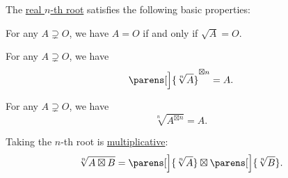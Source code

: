 \begin{proposition}\label{thm:def:principal_nonnegative_nth_root}
  The \hyperref[def:principal_nonnegative_nth_root]{real \( n \)-th root} satisfies the following basic properties:
  \begin{thmenum}
     For any \( A \supsetneq O \), we have \( A = O \) if and only if \( \sqrt A = O \).

     For any \( A \supsetneq O \), we have
    \begin{equation}\label{eq:thm:def:principal_nonnegative_nth_root/power_of_root}
      \parens[\Big]{ \sqrt[n]{ A } }^{\boxtimes n} = A.
    \end{equation}

     For any \( A \supsetneq O \), we have
    \begin{equation}\label{eq:thm:def:principal_nonnegative_nth_root/root_of_power}
      \sqrt[n]{ A^{\boxtimes n} } = A.
    \end{equation}

     Taking the \( n \)-th root is \hyperref[def:multiplicative_function]{multiplicative}:
    \begin{equation}\label{eq:thm:def:principal_nonnegative_nth_root/multiplicative}
      \sqrt[n]{ A \boxtimes B } = \parens[\Big]{\sqrt[n]{ A }} \boxtimes \parens[\Big]{\sqrt[n]{ B }}.
    \end{equation}
  \end{thmenum}
\end{proposition}
